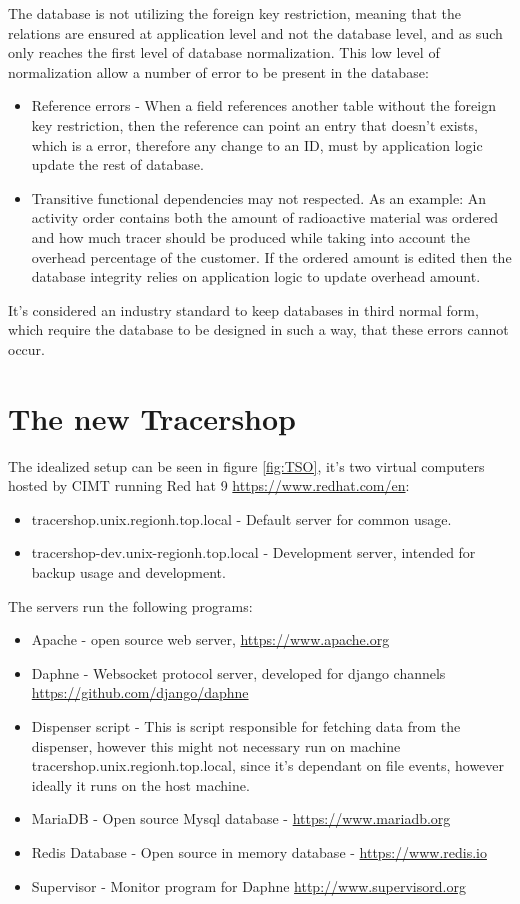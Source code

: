 \documentclass{article}
\begin{document}
The database is not utilizing the foreign key restriction, meaning that the relations are ensured at application level and not the database level, and as such only reaches the first level of database normalization.
This low level of normalization allow a number of error to be present in the database:
\begin{itemize}
  \item Reference errors - When a field references another table without the foreign key restriction, then the reference can point an entry that doesn't exists, which is a error, therefore any change to an ID, must by application logic update the rest of database.
  \item Transitive functional dependencies may not respected. As an example: An activity order contains both the amount of radioactive material was ordered and how much tracer should be produced while taking into account the overhead percentage of the customer. If the ordered amount is edited then the database integrity relies on application logic to update overhead amount.
\end{itemize}
It's considered an industry standard to keep databases in third normal form, which require the database to be designed in such a way, that these errors cannot occur.

\section*{The new Tracershop}

The idealized setup can be seen in figure \ref{fig:TSO}, it's two virtual computers hosted by \gls{CIMT} running Red hat 9 \url{https://www.redhat.com/en}:

\begin{itemize}
  \item tracershop.unix.regionh.top.local - Default server for common usage.
  \item tracershop-dev.unix-regionh.top.local - Development server, intended for backup usage and development.
\end{itemize}

The servers run the following programs:

\begin{itemize}
  \item Apache - open source web server, \url{https://www.apache.org}
  \item Daphne - Websocket protocol server, developed for django channels \url{https://github.com/django/daphne}
  \item Dispenser script - This is script responsible for fetching data from the dispenser, however this might not necessary run on machine tracershop.unix.regionh.top.local, since it's dependant on file events, however ideally it runs on the host machine.
  \item MariaDB - Open source Mysql database - \url{https://www.mariadb.org}
  \item Redis Database - Open source in memory database - \url{https://www.redis.io}
  \item Supervisor - Monitor program for Daphne \url{http://www.supervisord.org}
\end{itemize}
\end{document}
